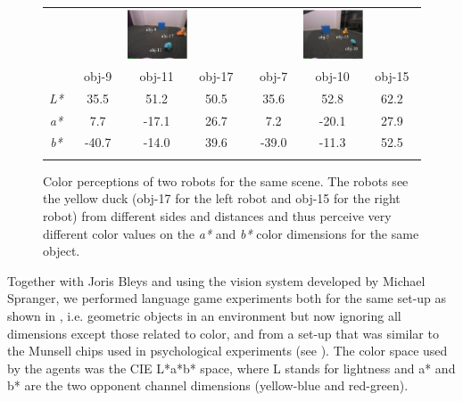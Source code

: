 \begin{figure}[htbp]
  \centering\small
  \begin{tabular}{c|ccc|ccc}
    \multicolumn{1}{c}{}
    & \multicolumn{3}{c}{\includegraphics[width=0.37\textwidth]{chap11/figs/grounding-scene-a}}
    & \multicolumn{3}{c}{\includegraphics[width=0.37\textwidth]{chap11/figs/grounding-scene-b}} \\
    & obj-9 & obj-11 & obj-17 & obj-7 & obj-10 & obj-15 \\
    \midrule
    \emph{L*} & 35.5 & 51.2 & 50.5 & 35.6 & 52.8 & 62.2 \\
    \emph{a*} & 7.7 & -17.1 & 26.7 & 7.2 & -20.1 & 27.9 \\
    \emph{b*} & -40.7 & -14.0 & 39.6 & -39.0 & -11.3 & 52.5 \\
    
  \lspbottomrule
\end{tabular}
  \caption[Comparison between the color perceptions of two robots for
  an example scene]{Color perceptions of two
    robots for the same scene. The robots see the yellow duck
    (obj-17 for the left robot and obj-15 for the right robot) from
    different sides and distances and thus perceive very different color values on 
    the \emph{a*} and \emph{b*} color dimensions for the same object.}
  \label{f:scene-example}
\end{figure}

Together with Joris Bleys and using the vision system developed by Michael Spranger, we 
performed language game experiments both for the same set-up as shown in , 
i.e. geometric objects in an environment but now ignoring all dimensions except those related to color, 
and from a set-up that was similar to the Munsell chips used
in psychological experiments (see ). The color space used by the agents was the CIE L*a*b* space, where 
L stands for lightness and a* and b* are the two opponent channel dimensions (yellow-blue and red-green). 

